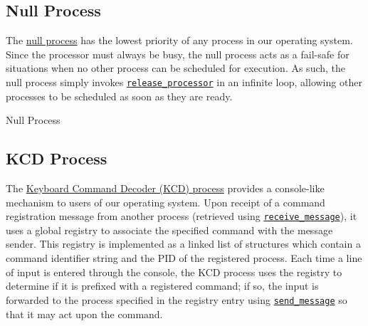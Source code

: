 \documentclass[12pt]{report}
\begin{document}
\subsection{Null Process}

The \hyperref[alg:nullprocess]{null process} has the lowest priority of any process in our operating system. Since the processor must always be busy, the null process acts as a fail­-safe for situations when no other process can be scheduled for execution. As such, the null process simply invokes \hyperref[alg:releasingtheprocessor]{\texttt{release_processor}} in an infinite loop, allowing other processes to be scheduled as soon as they are ready.\\

\begin{algorithm}
\caption{Null Process}
\label{alg:nullprocess}
\begin{algorithmic}[1]
        \State {}
    \EndWhile
\EndProcedure
\end{algorithmic}
\end{algorithm}

\subsection{KCD Process}

The \hyperref[alg:kcdprocess]{Keyboard Command Decoder (KCD) process} provides a console-like mechanism to users of our operating system. Upon receipt of a command registration message from another process (retrieved using \hyperref[alg:receivingmessages]{\texttt{receive_message}}), it uses a global registry to associate the specified command with the message sender. This registry is implemented as a linked list of structures which contain a command identifier string and the PID of the registered process. Each time a line of input is entered through the console, the KCD process uses the registry to determine if it is prefixed with a registered command; if so, the input is forwarded to the process specified in the registry entry using \hyperref[alg:sendingmessages]{\texttt{send_message}} so that it may act upon the command.\\
\end{document}
